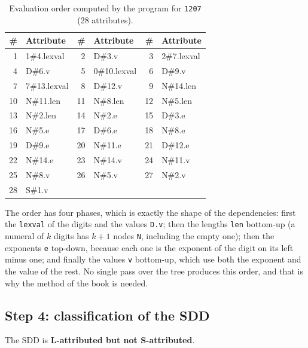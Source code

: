 \documentclass[11pt,letterpaper]{article}
\newcommand{\nt}[1]{\texttt{#1}}
\newcommand{\attr}[1]{\texttt{#1}}
\begin{document}
\begin{table}[H]
\centering
\small
\caption{Evaluation order computed by the program for \nt{1207} (28 attributes).}
\label{tab:orden}
\begin{tabular}{@{}r l r l r l@{}}
\toprule
\# & Attribute & \# & Attribute & \# & Attribute\\
\midrule
1 & 1\#4.lexval & 2 & D\#3.v & 3 & 2\#7.lexval \\
4 & D\#6.v & 5 & 0\#10.lexval & 6 & D\#9.v \\
7 & 7\#13.lexval & 8 & D\#12.v & 9 & N\#14.len \\
10 & N\#11.len & 11 & N\#8.len & 12 & N\#5.len \\
13 & N\#2.len & 14 & N\#2.e & 15 & D\#3.e \\
16 & N\#5.e & 17 & D\#6.e & 18 & N\#8.e \\
19 & D\#9.e & 20 & N\#11.e & 21 & D\#12.e \\
22 & N\#14.e & 23 & N\#14.v & 24 & N\#11.v \\
25 & N\#8.v & 26 & N\#5.v & 27 & N\#2.v \\
28 & S\#1.v & & & & \\
\bottomrule
\end{tabular}
\end{table}

The order has four phases, which is exactly the shape of the dependencies: first the \attr{lexval}
of the digits and the values \attr{D.v}; then the lengths \attr{len} bottom-up (a numeral of $k$
digits has $k+1$ nodes \nt{N}, including the empty one); then the exponents \attr{e} top-down,
because each one is the exponent of the digit on its left minus one; and finally the values
\attr{v} bottom-up, which use both the exponent and the value of the rest. No single pass over the
tree produces this order, and that is why the method of the book is needed.

\subsection{Step 4: classification of the SDD}

The SDD is \textbf{L-attributed but not S-attributed}.
\end{document}
